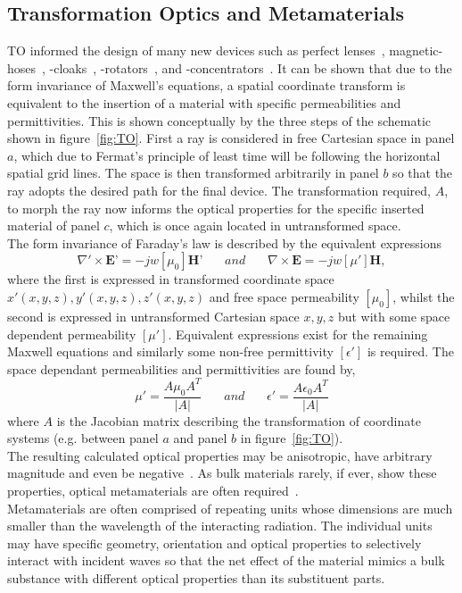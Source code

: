 \documentclass[11pt]{iopart}
\begin{document}
\subsection{Transformation Optics and Metamaterials}
TO informed the design of many new devices such as perfect
lenses~\cite{Pendry2000}, magnetic-hoses~\cite{Navau2014}, -cloaks~\cite{Sun2017},
-rotators~\cite{Sun2017}, and -concentrators~\cite{Navau2012}. It
can be shown that due to the form invariance of Maxwell's equations, a
spatial coordinate transform is equivalent to the insertion of a
material with specific permeabilities and permittivities. This is shown
conceptually by the three steps of the schematic shown in
figure~\ref{fig:TO}. First a ray is considered in free Cartesian space
in panel $a$, which due to Fermat's principle of least time will be
following the horizontal spatial grid lines.  The space is then
transformed arbitrarily in panel $b$ so that the ray adopts the
desired path for the final device. The transformation required, $A$,
to morph the ray now informs the optical properties for the specific
inserted material of panel $c$, which is once again located in
untransformed space.\\ The form invariance of Faraday's law is
described by the equivalent expressions
\begin{equation}
  \label{ME1}
  \nabla'\times \textbf{E'} = -jw[\mu_0]\textbf{H'}
  ~~~~~~~~and~~~~~~~~
  \nabla\times \textbf{E} = -jw[\mu']\textbf{H},
\end{equation}
where the first is expressed in transformed coordinate space $x'(x, y,
z), y'(x, y, z), z'(x, y, z)$ and free space permeability $[\mu_0]$,
whilst the second is expressed in untransformed Cartesian space $x, y,
z$ but with some space dependent permeability $[\mu']$.  Equivalent
expressions exist for the remaining Maxwell equations and similarly
some non-free permittivity $[\epsilon']$ is required. The space
dependant permeabilities and permittivities are found by,
\begin{equation}
  \label{eqn:J}
  \mu'=\frac{A\mu_0 A^T}{|A|}
  ~~~~~~~~and~~~~~~~~
  \epsilon'=\frac{A\epsilon_0 A^T}{|A|}
\end{equation}
where $A$ is the Jacobian matrix describing the transformation of
coordinate systems (e.g. between panel $a$ and panel $b$ in
figure~\ref{fig:TO}). \\ The resulting calculated optical properties
may be anisotropic, have arbitrary magnitude and even be
negative~\cite{Pendry2000}. As bulk materials rarely, if ever, show these
properties, optical metamaterials are often
required~\cite{Smith2004}. \\ Metamaterials are often comprised of
repeating units whose dimensions are much smaller than the wavelength
of the interacting radiation. The individual units may
have specific geometry, orientation and optical properties to
selectively interact with incident waves so that the net effect of the
material mimics a bulk substance with different optical properties
than its substituent parts.\\
\end{document}
